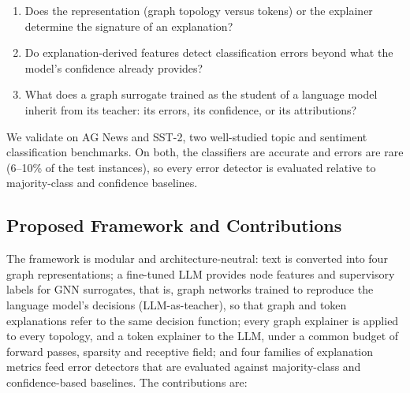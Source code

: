 \documentclass[preprint, times, review, 10pt]{elsarticle}
\begin{document}
\begin{enumerate}
    \item Does the representation (graph topology versus tokens) or the explainer determine the signature of an explanation?
    \item Do explanation-derived features detect classification errors beyond what the model's confidence already provides?
    \item What does a graph surrogate trained as the student of a language model inherit from its teacher: its errors, its confidence, or its attributions?
\end{enumerate}

We validate on AG News and SST-2, two well-studied topic and sentiment classification benchmarks. On both, the classifiers are accurate and errors are rare (6--10\% of the test instances), so every error detector is evaluated relative to majority-class and confidence baselines.

\subsection{Proposed Framework and Contributions}

The framework is modular and architecture-neutral: text is converted into four graph representations; a fine-tuned LLM provides node features and supervisory labels for GNN surrogates, that is, graph networks trained to reproduce the language model's decisions (LLM-as-teacher), so that graph and token explanations refer to the same decision function; every graph explainer is applied to every topology, and a token explainer to the LLM, under a common budget of forward passes, sparsity and receptive field; and four families of explanation metrics feed error detectors that are evaluated against majority-class and confidence-based baselines. The contributions are:
\end{document}
